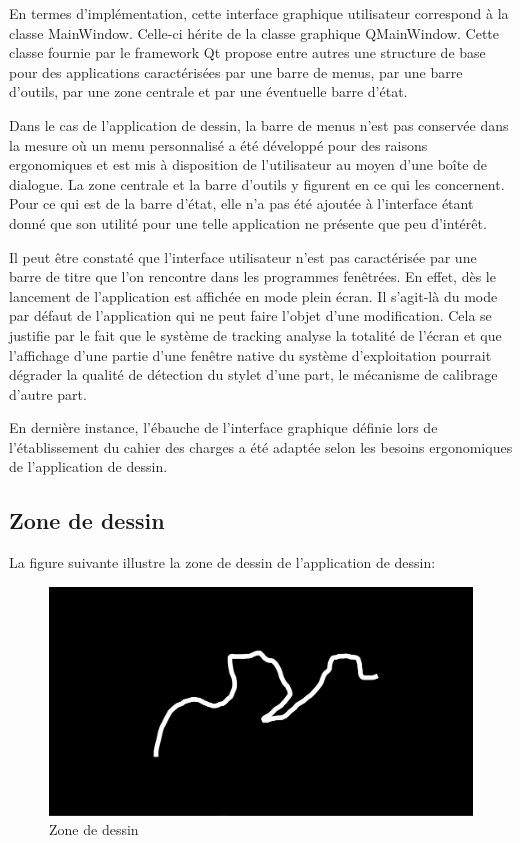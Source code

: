 \documentclass[11pt,a4paper,oldfontcommands]{memoir}
\begin{document}
En termes d'implémentation, cette interface graphique utilisateur correspond à la classe MainWindow. Celle-ci hérite de la classe graphique QMainWindow. Cette classe fournie par le framework Qt propose entre autres une structure de base pour des applications caractérisées par une barre de menus, par une barre d'outils, par une zone centrale et par une éventuelle barre d'état. 

Dans le cas de l'application de dessin, la barre de menus n'est pas conservée dans la mesure où un menu personnalisé a été développé pour des raisons ergonomiques et est mis à disposition de l'utilisateur au moyen d'une boîte de dialogue. La zone centrale et la barre d'outils y figurent en ce qui les concernent. Pour ce qui est de la barre d'état, elle n'a pas été ajoutée à l'interface étant donné que son utilité pour une telle application ne présente que peu d'intérêt.

Il peut être constaté que l'interface utilisateur n'est pas caractérisée par une barre de titre que l'on rencontre dans les programmes fenêtrées. En effet, dès le lancement de l'application est affichée en mode plein écran. Il s'agit-là du mode par défaut de l'application qui ne peut faire l'objet d'une modification. Cela se justifie par le fait que le système de tracking analyse la totalité de l'écran et que l'affichage d'une partie d'une fenêtre native du système d'exploitation pourrait dégrader la qualité de détection du stylet d'une part, le mécanisme de calibrage d'autre part.

En dernière instance, l'ébauche de l'interface graphique définie lors de l'établissement du cahier des charges a été adaptée selon les besoins ergonomiques de l'application de dessin.

\subsection{Zone de dessin}

La figure suivante illustre la zone de dessin de l'application de dessin:

\begin{figure}[h]
\centering
\includegraphics[scale=0.4]{images/drawing-area.png}
\caption{Zone de dessin}
\end{figure}
\end{document}
